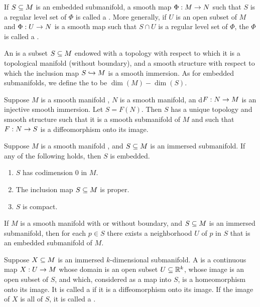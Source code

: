 \dfn If $S\subseteq M$ is an embedded submanifold, a smooth map $\Phi:M\rightarrow N$ such that $S$ is a regular level set of $\Phi$ is called a . More generally, if $U$ is an open subset of $M$ and $\Phi:U\rightarrow N$ is a smooth map such that $S\cap U$ is a regular level set of $\Phi$, the $\Phi$ is called a .

\dfn An  is a subset $S\subseteq M$ endowed with a topology with respect to which it is a topological manifold (without boundary), and a smooth structure with respect to which the inclusion map $S\hookrightarrow M$ is a smooth immersion. As for embedded submanifolds, we define the  to be $\dim(M) - \dim(S)$.

\setcounter{thm}{17}

\begin{prop}
Suppose $M$ is a smooth manifold \wowob, $N$ is a smooth manifold, an d$F:N\rightarrow M$ is an injective smooth immersion. Let $S = F(N)$. Then $S$ has a unique topology and smooth structure such that it is a smooth submanifold of $M$ and such that $F:N\rightarrow S$ is a diffeomorphism onto its image.
\end{prop}

\setcounter{thm}{20}

\begin{prop}
Suppose $M$ is a smooth manifold \wowob, and $S\subseteq M$ is an immersed submanifold. If any of the following holds, then $S$ is embedded.
\begin{enumerate}
    \item $S$ has codimension 0 in $M$.
    \item The inclusion map $S\subseteq M$ is proper.
    \item $S$ is compact.
\end{enumerate}
\end{prop}

\begin{prop}
If $M$ is a smooth manifold with or without boundary, and $S\subseteq M$ is an immersed submanifold, then for each $p\in S$ there exists a neighborhood $U$ of $p$ in $S$ that is an embedded submanifold of $M$.
\end{prop}

\dfn Suppose $X\subseteq M$ is an immersed $k$-dimensional submanifold. A  is a continuous map $X:U\rightarrow M$ whose domain is an open subset $U\subseteq \mathbb{R}^k$, whose image is an open subset of $S$, and which, considered as a map into $S$, is a homeomorphism onto its image. It is called a  if it is a diffeomorphism onto its image. If the image of $X$ is all of $S$, it is called a .

